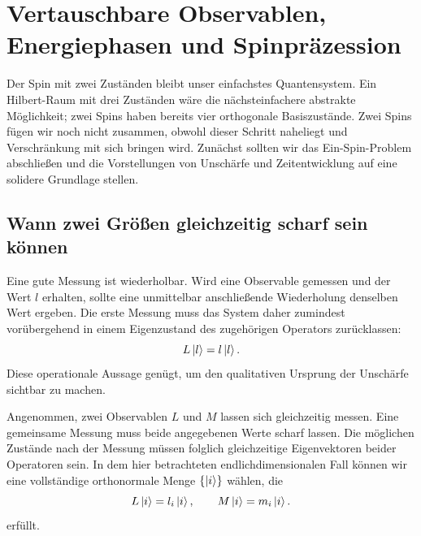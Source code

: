 \chapter{Vertauschbare Observablen, Energiephasen und Spinpräzession}


Der Spin mit zwei Zuständen bleibt unser einfachstes Quantensystem. Ein Hilbert-Raum mit drei Zuständen wäre die nächsteinfachere abstrakte Möglichkeit; zwei Spins haben bereits vier orthogonale Basiszustände. Zwei Spins fügen wir noch nicht zusammen, obwohl dieser Schritt naheliegt und Verschränkung mit sich bringen wird. Zunächst sollten wir das Ein-Spin-Problem abschließen und die Vorstellungen von Unschärfe und Zeitentwicklung auf eine solidere Grundlage stellen.

\section{Wann zwei Größen gleichzeitig scharf sein können}

Eine gute Messung ist wiederholbar. Wird eine Observable gemessen und der Wert \(l\) erhalten, sollte eine unmittelbar anschließende Wiederholung denselben Wert ergeben. Die erste Messung muss das System daher zumindest vorübergehend in einem Eigenzustand des zugehörigen Operators zurücklassen:
\begin{equation}
L\left\lvert l\right\rangle=l\left\lvert l\right\rangle.
\end{equation}
Diese operationale Aussage genügt, um den qualitativen Ursprung der Unschärfe sichtbar zu machen.

Angenommen, zwei Observablen \(L\) und \(M\) lassen sich gleichzeitig messen. Eine gemeinsame Messung muss beide angegebenen Werte scharf lassen. Die möglichen Zustände nach der Messung müssen folglich gleichzeitige Eigenvektoren beider Operatoren sein. In dem hier betrachteten endlichdimensionalen Fall können wir eine vollständige orthonormale Menge \(\{\left\lvert i\right\rangle\}\) wählen, die
\begin{equation}
L\left\lvert i\right\rangle=l_i\left\lvert i\right\rangle,
\qquad
M\left\lvert i\right\rangle=m_i\left\lvert i\right\rangle.
\label{eq:l5-common-eigenvectors}
\end{equation} erfüllt.

